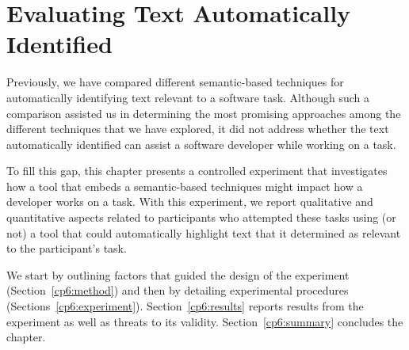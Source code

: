 \setcounter{chapter}{5}
\setcounter{rq}{1}


\chapter{Evaluating Text Automatically Identified}
\label{ch:assisting}




Previously, we have compared different semantic-based techniques for automatically identifying text relevant to a software task.
Although such a comparison assisted us in determining the most promising approaches among the different techniques that we have explored, it did not address whether 
the text automatically identified  
can assist a software developer while working on a task.



To fill this gap, this chapter presents a controlled experiment that 
investigates how a tool that embeds a semantic-based techniques 
might impact how a developer works on a task. 
With this experiment, we report qualitative and quantitative aspects related to participants who attempted these tasks using
(or not) a tool that could automatically highlight text that it  determined as relevant to the participant's task. 





We start by outlining factors that guided the design of the experiment (Section~\ref{cp6:method}) and then 
by detailing experimental procedures (Sections~\ref{cp6:experiment}).
Section~\ref{cp6:results} reports results from the experiment as well as threats to its validity.
Section~\ref{cp6:summary} concludes the chapter.


\clearpage






















% 


